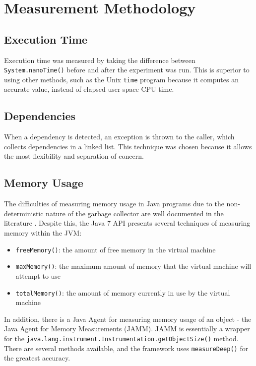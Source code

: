 \section{Measurement Methodology} \label{sec:methodology/measurements}
	\subsection{Execution Time} \label{sec:methodology/measurements/time}
	Execution time was measured by taking the difference between \texttt{System.nanoTime()} before and after the experiment was run. This is superior to using other methods, such as the Unix \texttt{time} program because it computes an accurate value, instead of elapsed user-space CPU time.
	
	\subsection{Dependencies} \label{sec:methodology/measurements/dependencies}
	When a dependency is detected, an exception is thrown to the caller, which collects dependencies in a linked list. This technique was chosen because it allows the most flexibility and separation of concern.
	
	\subsection{Memory Usage} \label{sec:methodology/measurements/memory}
	The difficulties of measuring memory usage in Java programs due to the non-deterministic nature of the garbage collector are well documented in the literature \citep{Kim2000,Ogata2010}. Despite this, the Java 7 API presents several techniques \citep{RuntimeDocs} of measuring memory within the JVM:
	
	\begin{itemize}
		\item \texttt{freeMemory()}: the amount of free memory in the virtual machine
		\item \texttt{maxMemory()}: the maximum amount of memory that the virtual machine will attempt to use
		\item \texttt{totalMemory()}: the amount of memory currently in use by the virtual machine
	\end{itemize}
	
	In addition, there is a Java Agent for measuring memory usage of an object - the Java Agent for Memory Measurements \citep{JAMM} (JAMM). JAMM is essentially a wrapper for the \texttt{java.lang.instrument.Instrumentation.getObjectSize()} method. There are several methods available, and the framework uses \texttt{measureDeep()} for the greatest accuracy.
	
